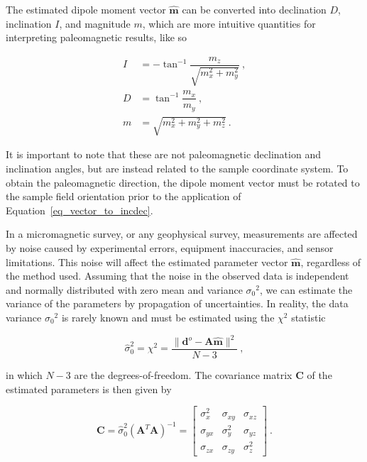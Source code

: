 \noindent
The estimated dipole moment vector $\hat{\mathbf{m}}$ can be converted into declination $D$, inclination $I$, and magnitude $m$, which are more intuitive quantities for interpreting paleomagnetic results, like so \citep{Tauxe2018}

\begin{equation}
\label{eq_vector_to_incdec}
\begin{aligned}
I &= -\tan^{-1}\dfrac{m_z}{\sqrt{m_x^2 + m_y^2}} \ , \\
D &= \tan^{-1}\dfrac{m_x}{m_y} \ , \\
m &= \sqrt{m_x^2 + m_y^2 + m_z^2} \ .
\end{aligned}
\end{equation}

\noindent
It is important to note that these are not paleomagnetic declination and inclination angles, but are instead related to the sample coordinate system. To obtain the paleomagnetic direction, the dipole moment vector must be rotated to the sample field orientation prior to the application of Equation~\ref{eq_vector_to_incdec}.

In a micromagnetic survey, or any geophysical survey, measurements are affected by noise caused by experimental errors, equipment inaccuracies, and sensor limitations. This noise will affect the estimated parameter vector $\mathbf{\hat{m}}$, regardless of the method used. Assuming that the noise in the observed data is independent and normally distributed with zero mean and variance ${\sigma_0}^2$, we can estimate the variance of the parameters by propagation of uncertainties. In reality, the data variance  ${\sigma_0}^2$ is rarely known and must be estimated using the $\chi^2$ statistic \citep{Aster2019}

\begin{equation}
\label{eq_chi_square}
\hat{\sigma}_0^2 = {\chi}^2 = \dfrac{\|\mathbf{d}^o - \mathbf{A}\hat{\mathbf{m}}\|^2}{N - 3}\ ,
\end{equation}

\noindent
in which $N - 3$  are the degrees-of-freedom.
The covariance matrix $\mathbf{C}$ of the estimated parameters is then given by \citep{Aster2019}

\begin{equation}
\label{eq_covariance}
\mathbf{C}
=
\hat{\sigma}_0^2 (\mathbf{A}^T\mathbf{A})^{-1}
=
\begin{bmatrix}
\sigma_x^2 & \sigma_{xy} & \sigma_{xz} \\
\sigma_{yx} & \sigma_y^2 & \sigma_{yz} \\
\sigma_{zx} & \sigma_{zy} & \sigma_z^2
\end{bmatrix}
\ .
\end{equation}

